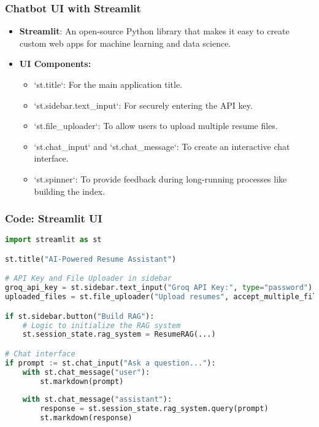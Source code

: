 \begin{frame}[fragile]\frametitle{Chatbot UI with Streamlit}
    \begin{itemize}
        \item \textbf{Streamlit}: An open-source Python library that makes it easy to create custom web apps for machine learning and data science.
        \item \textbf{UI Components:}
        \begin{itemize}
            \item `st.title`: For the main application title.
            \item `st.sidebar.text\_input`: For securely entering the API key.
            \item `st.file\_uploader`: To allow users to upload multiple resume files.
            \item `st.chat\_input` and `st.chat\_message`: To create an interactive chat interface.
            \item `st.spinner`: To provide feedback during long-running processes like building the index.
        \end{itemize}
    \end{itemize}
\end{frame}

\begin{frame}[fragile]\frametitle{Code: Streamlit UI}
    \begin{lstlisting}[language=Python, basicstyle=\tiny, caption={streamlit\_main.py}]
import streamlit as st

st.title("AI-Powered Resume Assistant")

# API Key and File Uploader in sidebar
groq_api_key = st.sidebar.text_input("Groq API Key:", type="password")
uploaded_files = st.file_uploader("Upload resumes", accept_multiple_files=True)

if st.sidebar.button("Build RAG"):
    # Logic to initialize the RAG system
    st.session_state.rag_system = ResumeRAG(...)

# Chat interface
if prompt := st.chat_input("Ask a question..."):
    with st.chat_message("user"):
        st.markdown(prompt)
    
    with st.chat_message("assistant"):
        response = st.session_state.rag_system.query(prompt)
        st.markdown(response)
    \end{lstlisting}
\end{frame}

